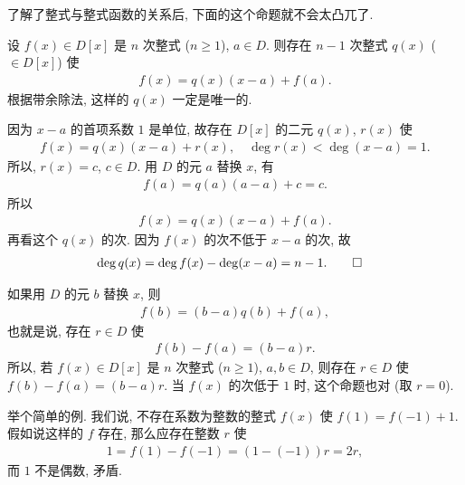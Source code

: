 了解了整式与整式函数的关系后, 下面的这个命题就不会太凸兀了.

\begin{proposition}
    设 $f(x) \in D[x]$ 是 $n$ 次整式 ($n \geq 1$), $a \in D$. 则存在 $n-1$ 次整式 $q(x)$ ($\in D[x]$) 使
    \begin{align*}
        f(x) = q(x) (x-a) + f(a).
    \end{align*}
    根据带余除法, 这样的 $q(x)$ 一定是唯一的.
\end{proposition}

\begin{pf}
    因为 $x-a$ 的首项系数 $1$ 是单位, 故存在 $D[x]$ 的二元 $q(x)$, $r(x)$ 使
    \begin{align*}
        f(x) = q(x) (x-a) + r(x), \quad \deg r(x) < \deg (x-a) = 1.
    \end{align*}
    所以, $r(x) = c$, $c \in D$. 用 $D$ 的元 $a$ 替换 $x$, 有
    \begin{align*}
        f(a) = q(a) (a-a) + c = c.
    \end{align*}
    所以
    \begin{align*}
        f(x) = q(x) (x-a) + f(a).
    \end{align*}
    再看这个 $q(x)$ 的次. 因为 $f(x)$ 的次不低于 $x-a$ 的次, 故
    \begin{align*}
         & \deg q(x) = \deg f(x) - \deg (x-a) = n-1. \qedhere
    \end{align*}
\end{pf}

\begin{remark}
    如果用 $D$ 的元 $b$ 替换 $x$, 则
    \begin{align*}
        f(b) = (b-a)q(b) + f(a),
    \end{align*}
    也就是说, 存在 $r \in D$ 使
    \begin{align*}
        f(b) - f(a) = (b-a)r.
    \end{align*}
    所以, 若 $f(x) \in D[x]$ 是 $n$ 次整式 ($n \geq 1$), $a,b \in D$, 则存在 $r \in D$ 使 $f(b) - f(a) = (b-a)r$. 当 $f(x)$ 的次低于 $1$ 时, 这个命题也对 (取 $r=0$).

    举个简单的例. 我们说, 不存在系数为整数的整式 $f(x)$ 使 $f(1) = f(-1) + 1$. 假如说这样的 $f$ 存在, 那么应存在整数 $r$ 使
    \begin{align*}
        1 = f(1) - f(-1) = (1 - (-1))r = 2r,
    \end{align*}
    而 $1$ 不是偶数, 矛盾.
\end{remark}

